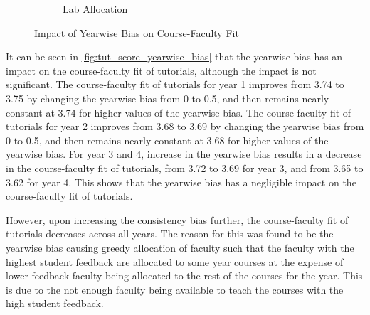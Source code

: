 \begin{figure}[H]
\begin{subfigure}[h]{0.4\linewidth}
    \caption{Lab Allocation}
    \label{fig:lab_score_yearwise_bias}
  \end{subfigure}
  \caption{Impact of Yearwise Bias on Course-Faculty Fit}
\end{figure}

It can be seen in \autoref{fig:tut_score_yearwise_bias} that the yearwise bias has an impact on the course-faculty fit of tutorials, although the impact is not significant. The course-faculty fit of tutorials for year 1 improves from 3.74 to 3.75 by changing the yearwise bias from 0 to 0.5, and then remains nearly constant at 3.74 for higher values of the yearwise bias. The course-faculty fit of tutorials for year 2 improves from 3.68 to 3.69 by changing the yearwise bias from 0 to 0.5, and then remains nearly constant at 3.68 for higher values of the yearwise bias. For year 3 and 4, increase in the yearwise bias  results in a decrease in the course-faculty fit of tutorials, from 3.72 to 3.69 for year 3, and from 3.65 to 3.62 for year 4. This shows that the yearwise bias has a negligible impact on the course-faculty fit of tutorials.

However, upon increasing the consistency bias further, the course-faculty fit of tutorials decreases across all years. The reason for this was found to be the yearwise bias causing greedy allocation of faculty such that the faculty with the highest student feedback are allocated to some year courses at the expense of lower feedback faculty being allocated to the rest of the courses for the year. This is due to the not enough faculty being available to teach the courses with the high student feedback.



